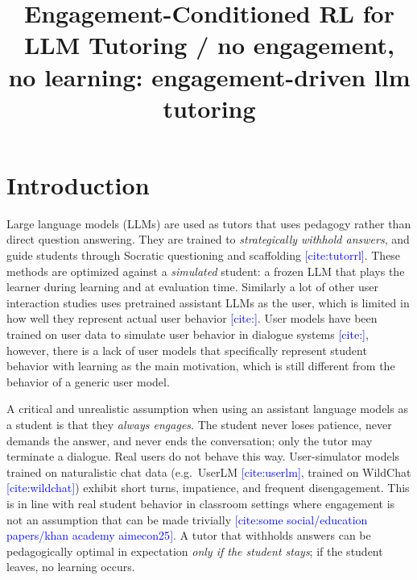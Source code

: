 \documentclass[11pt]{article}
\title{Engagement-Conditioned RL for LLM Tutoring / no engagement, no learning: engagement-driven llm tutoring }
\author{
}
\date{}
\newcommand{\cit}[1]{\textcolor{blue}{[\textsf{cite:#1}]}}
\begin{document}
\maketitle

\begin{abstract}
\end{abstract}

\section{Introduction}
\label{sec:intro}

Large language models (LLMs) are used as tutors that uses pedagogy rather than direct question answering. They are trained to \emph{strategically withhold answers}, and guide students through Socratic questioning and scaffolding \cit{tutorrl}. 
These methods are optimized against a \emph{simulated} student: a frozen LLM that plays
the learner during learning and at evaluation time. 
Similarly a lot of other user interaction studies uses pretrained assistant LLMs as the user, which is limited in how well they represent actual user behavior \cit{}. User models have been trained on user data to simulate user behavior in dialogue systems \cit{}, however, there is a lack of user models that specifically represent student behavior with learning as the main motivation, which is still different from the behavior of a generic user model.

A critical and unrealistic assumption when using an assistant language models as a student is that they \emph{always engages}. The student never loses patience, never demands the answer, and never ends the conversation; only the tutor
may terminate a dialogue. Real users do not behave this way. 
User-simulator models trained on naturalistic chat data (e.g.\ UserLM \cit{userlm}, trained on
WildChat \cit{wildchat}) exhibit short turns, impatience, and frequent disengagement. 
This is in line with real student behavior in classroom settings where engagement is not an assumption that can be made trivially \cit{some social/education papers/khan academy aimecon25}.
A tutor that withholds answers can be pedagogically optimal in expectation \emph{only if the student stays}; if the student leaves, no learning occurs.
\end{document}
